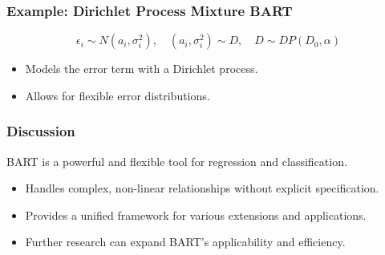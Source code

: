 \documentclass{beamer}
\begin{document}
\begin{frame}
\frametitle{Example: Dirichlet Process Mixture BART}
\begin{equation}
\epsilon_i \sim N(a_i, \sigma_i^2), \quad (a_i, \sigma_i^2) \sim D, \quad D \sim DP(D_0, \alpha)
\end{equation}
\begin{itemize}
    \item Models the error term with a Dirichlet process.
    \item Allows for flexible error distributions.
\end{itemize}
\end{frame}

\begin{frame}
\frametitle{Discussion}
BART is a powerful and flexible tool for regression and classification.
\begin{itemize}
    \item Handles complex, non-linear relationships without explicit specification.
    \item Provides a unified framework for various extensions and applications.
    \item Further research can expand BART's applicability and efficiency.
\end{itemize}
\end{frame}
\end{document}
